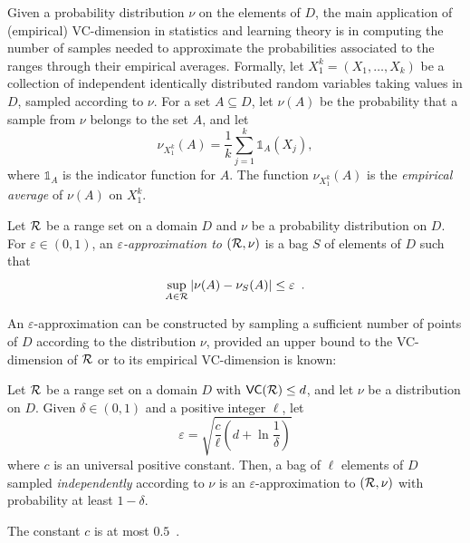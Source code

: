 Given a probability distribution $\nu$ on the elements of $D$, the main
application of (empirical) VC-dimension in statistics and learning theory is in
computing the number of samples needed to approximate the probabilities
associated to the ranges through their empirical averages.  Formally, let
$X_1^k=(X_1,\dotsc,X_k)$ be a collection of independent identically distributed
random variables taking values in $D$, sampled according to $\nu$.
For a set $A\subseteq D$, let $\nu(A)$ be the probability that a sample from
$\nu$ belongs to the set $A$, and let
\[
\nu_{X_1^k}(A)=\frac{1}{k}\sum_{j=1}^k\mathds{1}_A(X_j),\]
where $\mathds{1}_A$ is the indicator function for $A$. The function
$\nu_{X_1^k}(A)$ is the \emph{empirical average} of $\nu(A)$ on $X_1^k$.

\begin{definition}\label{def:eapprox}
  Let $\mathcal{R}$ be a range set on a domain
  $D$ and $\nu$ be a probability distribution on $D$. For $\varepsilon\in(0,1)$,
  an \emph{$\varepsilon$-approximation to $(\mathcal{R},\nu)$} is a bag $S$ of
  elements of $D$ such that
  \[
  \sup_{A\in\mathcal{R}}|\nu(A)-\nu_S(A)|\le\varepsilon\enspace.\]
\end{definition}

An $\varepsilon$-approximation can be constructed by sampling a sufficient
number of points of $D$ according to the distribution $\nu$, provided an upper
bound to the VC-dimension of $\mathcal{R}$ or to its empirical VC-dimension is known:

\begin{theorem}\label{thm:eapprox}
  Let $\mathcal{R}$ be a range set on a domain
  $D$ with $\mathsf{VC}(\mathcal{R})\le d$, and let $\nu$ be a distribution on $D$. Given
  $\delta\in(0,1)$ and a positive integer $\ell$, let
  \begin{equation}\label{eq:vceapprox}
    \varepsilon = \sqrt{\frac{c}{\ell}\left(d + \ln\frac{1}{\delta}\right)}
  \end{equation}
  where $c$ is an universal positive constant. Then, a bag of $\ell$
  elements of $D$ sampled \emph{independently} according to $\nu$ is an
  $\varepsilon$-approximation to $(\mathcal{R},\nu)$ with probability at least
  $1-\delta$.
\end{theorem}
The constant $c$ is at most $0.5$~\citep{LofflerP09}.

